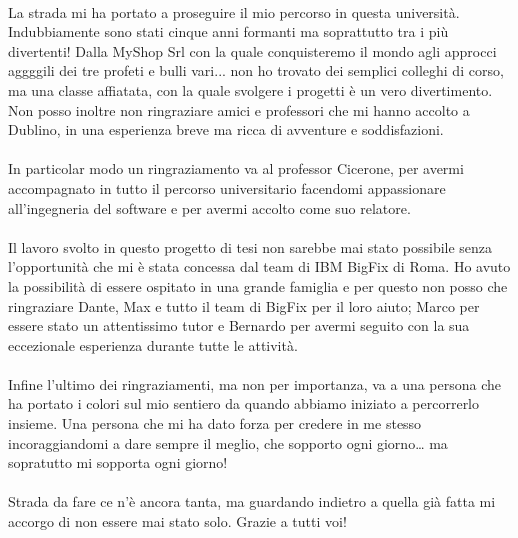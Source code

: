 \paragraph{}
La strada mi ha portato a proseguire il mio percorso in questa università. Indubbiamente sono stati cinque anni formanti ma soprattutto tra i più divertenti! Dalla MyShop Srl con la quale conquisteremo il mondo agli approcci aggggili dei tre profeti e bulli vari... non ho trovato dei semplici colleghi di corso, ma una classe affiatata, con la quale svolgere i progetti è un vero divertimento. Non posso inoltre non ringraziare amici e professori che mi hanno accolto a Dublino, in una esperienza breve ma ricca di avventure e soddisfazioni.

\paragraph{}
In particolar modo un ringraziamento va al professor Cicerone, per avermi accompagnato in tutto il percorso universitario facendomi appassionare all'ingegneria del software e per avermi accolto come suo relatore.

\paragraph{}
Il lavoro svolto in questo progetto di tesi non sarebbe mai stato possibile senza l'opportunità che mi è stata concessa dal team di IBM BigFix di Roma. Ho avuto la possibilità di essere ospitato in una grande famiglia e per questo non posso che ringraziare Dante, Max e tutto il team di BigFix per il loro aiuto; Marco per essere stato un attentissimo tutor e Bernardo per avermi seguito con la sua eccezionale esperienza durante tutte le attività.

\paragraph{}
Infine l’ultimo dei ringraziamenti, ma non per importanza, va a una persona che ha portato i colori sul mio sentiero da quando abbiamo iniziato a percorrerlo insieme. Una persona che mi ha dato forza per credere in me stesso incoraggiandomi a dare sempre il meglio, che sopporto ogni giorno… ma sopratutto mi sopporta ogni giorno!

\paragraph{}
Strada da fare ce n'è ancora tanta, ma guardando indietro a quella già fatta mi accorgo di non essere mai stato solo. Grazie a tutti voi!
